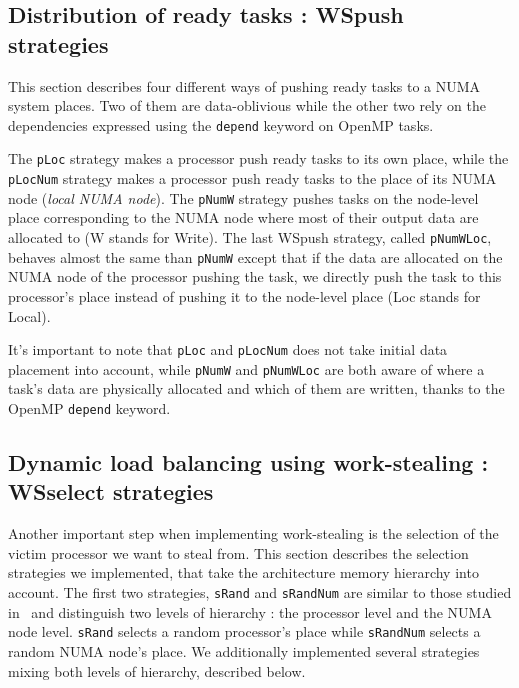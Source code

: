 \documentclass{Styles/llncs}
\begin{document}
\subsection{Distribution of ready tasks : WSpush strategies}

This section describes four different ways of pushing ready tasks to a NUMA system places.
Two of them are data-oblivious while the other two rely on the dependencies expressed using the \verb!depend! keyword on OpenMP tasks.

The \verb/pLoc/ strategy makes a processor push ready tasks to
    its own place, while the \verb/pLocNum/ strategy makes a processor push ready tasks to the place of its NUMA node (\emph{local NUMA node}).
The \verb/pNumW/ strategy pushes tasks on the node-level place corresponding to the NUMA node where most of their output data are allocated to (W stands for Write).
The last WSpush strategy, called \verb/pNumWLoc/, behaves almost the same than \verb!pNumW! except that if
    the data are allocated on the NUMA node of the processor pushing the task, we directly push the task to this processor's place instead of pushing it to the node-level place (Loc stands for Local).
    
    It's important to note that \verb!pLoc! and \verb!pLocNum! does not take initial data placement into account, while \verb!pNumW! and \verb!pNumWLoc! are both aware of where a task's data are physically allocated and which of them are written, thanks to the OpenMP \verb!depend! keyword.

\subsection{Dynamic load balancing using work-stealing : WSselect strategies}

Another important step when implementing work-stealing is the selection of the victim processor we want to steal from.
This section describes the selection strategies we implemented, that take the architecture memory hierarchy into account.
The first two strategies, \verb!sRand! and \verb!sRandNum! are similar to those studied in~\cite{DBLP:journals/ijhpca/OlivierPWSP12}
and distinguish two levels of hierarchy : the processor level and the NUMA node level.
\verb/sRand/ selects a random processor's place while \verb/sRandNum/ selects a random NUMA node's place.
We additionally implemented several strategies mixing both levels of hierarchy,
described below.
\end{document}
